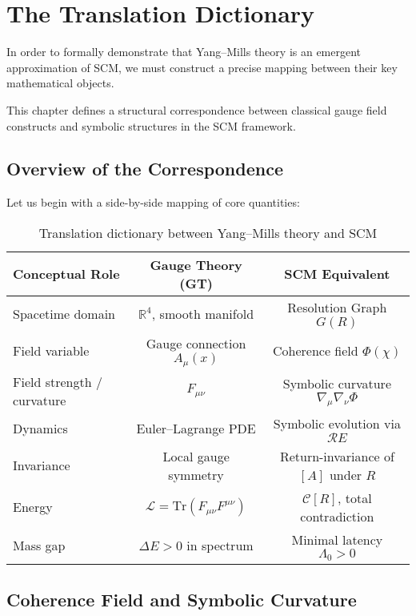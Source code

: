 \chapter{The Translation Dictionary} \label{chapter-translation-dictionary}

In order to formally demonstrate that Yang--Mills theory is an emergent approximation of SCM, we must construct a precise mapping between their key mathematical objects.

This chapter defines a structural correspondence between classical gauge field constructs and symbolic structures in the SCM framework.

\section{Overview of the Correspondence}

Let us begin with a side-by-side mapping of core quantities:

\begin{table}[h!]
\centering
\begin{tabular}{|l|c|c|}
\hline
\textbf{Conceptual Role} & \textbf{Gauge Theory (GT)} & \textbf{SCM Equivalent} \\
\hline
Spacetime domain         & $\mathbb{R}^4$, smooth manifold & Resolution Graph $G(R)$ \\
\hline
Field variable           & Gauge connection $A_\mu(x)$     & Coherence field $\Phi(\chi)$ \\
\hline
Field strength / curvature & $F_{\mu\nu}$                   & Symbolic curvature $\nabla_\mu \nabla_\nu \Phi$ \\
\hline
Dynamics                 & Euler--Lagrange PDE             & Symbolic evolution via $\mathcal{R}E$ \\
\hline
Invariance               & Local gauge symmetry            & Return-invariance of $[A]$ under $R$ \\
\hline
Energy                   & $\mathcal{L} = \text{Tr}(F_{\mu\nu}F^{\mu\nu})$ & $\mathcal{C}[R]$, total contradiction \\
\hline
Mass gap                 & $\Delta E > 0$ in spectrum      & Minimal latency $\Lambda_0 > 0$ \\
\hline
\end{tabular}
\caption{Translation dictionary between Yang--Mills theory and SCM}
\end{table}

\section{Coherence Field and Symbolic Curvature}

